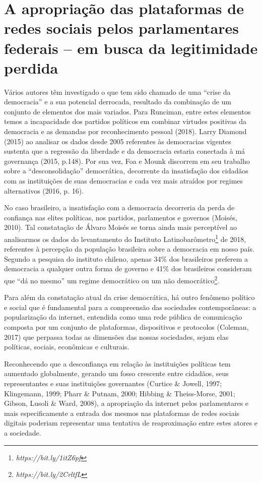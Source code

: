 \section{A apropriação das plataformas de redes sociais pelos
parlamentares federais -- em busca da legitimidade perdida}

Vários autores têm investigado o que tem sido chamado de uma ``crise da
democracia'' e a sua potencial derrocada, resultado da combinação de um
conjunto de elementos dos mais variados. Para Runciman, entre estes
elementos temos a incapacidade dos partidos políticos em combinar
virtudes positivas da democracia e as demandas por reconhecimento
pessoal (2018). Larry Diamond (2015) ao analisar os dados desde 2005
referentes às democracias vigentes sustenta que a regressão da liberdade
e da democracia estaria conectada à má governança (2015, p.148). Por sua
vez, Foa e Mounk discorrem em seu trabalho sobre a ``desconsolidação''
democrática, decorrente da insatisfação dos cidadãos com as instituições
de suas democracias e cada vez mais atraídos por regimes alternativos
(2016, p. 16).

No caso brasileiro, a insatisfação com a democracia decorreria da perda
de confiança nas elites políticas, nos partidos, parlamentos e governos
(Moisés, 2010). Tal constatação de Álvaro Moisés se torna ainda mais
perceptível ao analisarmos os dados do levantamento do Instituto
Latinobarômetro\footnote{\emph{https://bit.ly/1itZ6pf}}
de 2018, referentes à percepção da população brasileira sobre a
democracia em nosso país. Segundo a pesquisa do instituto chileno,
apenas 34\% dos brasileiros preferem a democracia a qualquer outra forma
de governo e 41\% dos brasileiros consideram que ``dá no mesmo'' um
regime democrático ou um não democrático\footnote{\emph{https://bit.ly/2CrltfL}}.

Para além da constatação atual da crise democrática, há outro fenômeno
político e social que é fundamental para a compreensão das sociedades
contemporâneas: a popularização da internet, entendida como uma rede
pública de comunicação composta por um conjunto de plataformas,
dispositivos e protocolos (Coleman, 2017) que perpassa todas as
dimensões das nossas sociedades, sejam elas políticas, sociais,
econômicas e culturais.

Reconhecendo que a desconfiança em relação às instituições políticas tem
aumentado globalmente, gerando um fosso crescente entre cidadãos, seus
representantes e suas instituições governantes (Curtice \& Jowell, 1997;
Klingemann, 1999; Pharr \& Putnam, 2000; Hibbing \& Theiss-Morse, 2001;
Gibson, Lusoli \& Ward, 2008), a apropriação da internet pelos
parlamentares e mais especificamente a entrada dos mesmos nas
plataformas de redes sociais digitais poderiam representar uma tentativa
de reaproximação entre estes atores e a sociedade.

